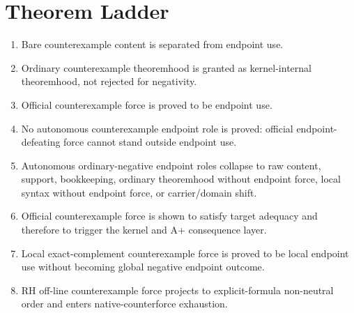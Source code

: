 \documentclass[11pt]{article}
\begin{document}
\section{Theorem Ladder}\label{app:ladder}

\begin{enumerate}
\item Bare counterexample content is separated from endpoint use.
\item Ordinary counterexample theoremhood is granted as kernel-internal theoremhood, not rejected for negativity.
\item Official counterexample force is proved to be endpoint use.
\item No autonomous counterexample endpoint role is proved: official endpoint-defeating force cannot stand outside endpoint use.
\item Autonomous ordinary-negative endpoint roles collapse to raw content, support, bookkeeping, ordinary theoremhood without endpoint force, local syntax without endpoint force, or carrier/domain shift.
\item Official counterexample force is shown to satisfy target adequacy and therefore to trigger the kernel and A+ consequence layer.
\item Local exact-complement counterexample force is proved to be local endpoint use without becoming global negative endpoint outcome.
\item RH off-line counterexample force projects to explicit-formula non-neutral order and enters native-counterforce exhaustion.
\end{enumerate}
\end{document}

